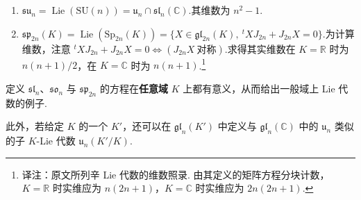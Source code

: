 \begin{numpara}[经典 Lie 代数]
\begin{enumerate}[label=\roman*),start=3]
\item $\mathfrak{su}_n=\operatorname{Lie}(\mathrm{SU}(n))=\mathfrak{u}_n\cap\mathfrak{sl}_n(\mathbb{C})$.其维数为 $n^{2}-1$.
\item $\mathfrak{sp}_{2n}(K)=\operatorname{Lie}(\mathrm{Sp}_{2n}(K))=\{X\in\mathfrak{gl}_{2n}(K),\ {}^{t}XJ_{2n}+J_{2n}X=0\}$.为计算维数，注意 ${}^{t}XJ_{2n}+J_{2n}X=0\iff(J_{2n}X\ \text{对称})$.求得其实维数在 $K=\mathbb{R}$ 时为 $n(n+1)/2$，在 $K=\mathbb{C}$ 时为 $n(n+1)$.\footnote{译注：原文所列辛 Lie 代数的维数照录. 由其定义的矩阵方程分块计数，$K=\mathbb R$ 时实维应为 $n(2n+1)$，$K=\mathbb C$ 时实维应为 $2n(2n+1)$.}
\end{enumerate}

\begin{remark*}
定义 $\mathfrak{sl}_n$、$\mathfrak{so}_n$ 与 $\mathfrak{sp}_{2n}$ 的方程在\textbf{任意域} $K$ 上都有意义，从而给出一般域上 Lie 代数的例子.

此外，若给定 $K$ 的一个 $K'$，还可以在 $\mathfrak{gl}_n(K')$ 中定义与 $\mathfrak{gl}_n(\mathbb{C})$ 中的 $\mathfrak{u}_n$ 类似的子 $K$-Lie 代数 $\mathfrak{u}_n(K'/K)$.
\end{remark*}
\end{numpara}

